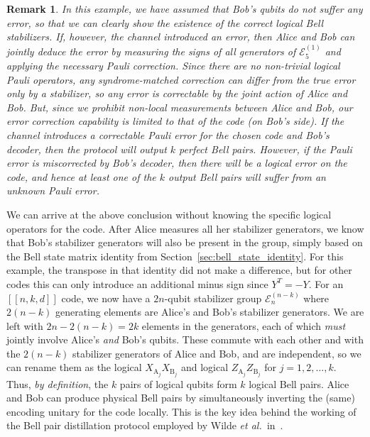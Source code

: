 \documentclass[journal,onecolumn]{IEEEtran}
\newtheorem{remark}[theorem]{Remark}
\newcommand{\etal}{\emph{et al.~}}
\newcommand{\llbr}{[\![}
\newcommand{\rrbr}{]\!]}
\newif\ifnotes
\newcommand{\bane}[1]{\ifnotes{{\color{dkgreen} [Bane: #1]}}\fi}
\begin{document}
\begin{remark} \label{rem:Bell_local_msmt}
\normalfont
In this example, we have assumed that Bob's qubits do not suffer any error, so that we can clearly show the existence of the correct logical Bell stabilizers.
If, however, the channel introduced an error, then Alice and Bob can \emph{jointly} deduce the error by measuring the signs of all generators of $\mathcal{E}_5^{(1)}$ and applying the necessary Pauli correction.
Since there are no non-trivial logical Pauli operators, any syndrome-matched correction can differ from the true error only by a stabilizer, so any error is correctable by the joint action of Alice and Bob.
But, since we prohibit \emph{non-local} measurements between Alice and Bob, our error correction capability is limited to that of the code (on Bob's side).
If the channel introduces a correctable Pauli error for the chosen code and Bob's decoder, then the protocol will output $k$ perfect Bell pairs.
However, if the Pauli error is miscorrected by Bob's decoder, then there will be a logical error on the code, and hence at least one of the $k$ output Bell pairs will suffer from an unknown Pauli error.
\end{remark}



We can arrive at the above conclusion without knowing the specific logical operators for the code.
After Alice measures all her stabilizer generators, we know that Bob's stabilizer generators will also be present in the group, simply based on the Bell state matrix identity from Section~\ref{sec:bell_state_identity}.
For this example, the transpose in that identity did not make a difference, but for other codes this can only introduce an additional minus sign since $Y^T = -Y$.
For an $\llbr n,k,d \rrbr$ code, we now have a $2n$-qubit stabilizer group $\mathcal{E}_n^{(n-k)}$ where $2(n-k)$ generating elements are Alice's and Bob's stabilizer generators.
We are left with $2n - 2(n-k) = 2k$ elements in the generators, each of which \emph{must} jointly involve Alice's \emph{and} Bob's qubits.
These commute with each other and with the $2(n-k)$ stabilizer generators of Alice and Bob, and are independent, so we can rename them as the logical $X_{\text{A}_j} X_{\text{B}_j}$ and logical $Z_{\text{A}_j} Z_{\text{B}_j}$ for $j=1,2,\ldots,k$.
Thus, \emph{by definition}, the $k$ pairs of logical qubits form $k$ logical Bell pairs.
Alice and Bob can produce physical Bell pairs by simultaneously inverting the (same) encoding unitary for the code locally.
This is the key idea behind the working of the Bell pair distillation protocol employed by Wilde \etal in~\cite{Wilde-isit10}.
 
\end{document}
